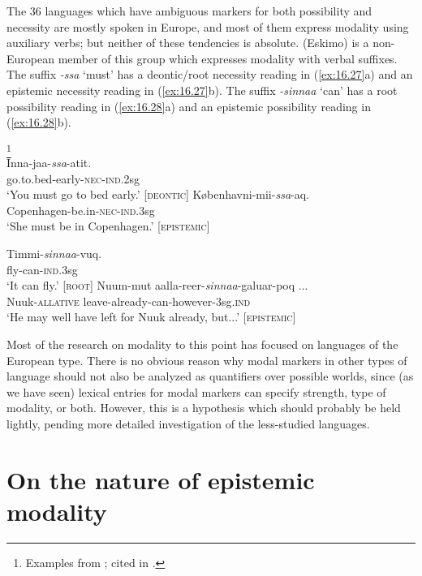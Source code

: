 The 36 languages which have ambiguous markers for both possibility and necessity are mostly spoken in Europe, and most of them express modality using auxiliary verbs; but neither of these tendencies is absolute.  (Eskimo) is a non-European member of this group which expresses modality with verbal suffixes. The suffix \textit{-ssa} ‘must’ has a deontic/root necessity reading in (\ref{ex:16.27}a) and an epistemic necessity reading in (\ref{ex:16.27}b). The suffix \textit{-sinnaa} ‘can’ has a root possibility reading in (\ref{ex:16.28}a) and an epistemic possibility reading in (\ref{ex:16.28}b).


\ea \label{ex:16.27}
\footnote{Examples from \citet[292–294, p.c.]{Fortescue1984}; cited in \citet{vanderAuweraAmmann2013}.} \\ 
\ea  \gll Inna-jaa-\textit{ssa}-atit.\\
go.to.bed-early-\textsc{nec-ind}.2sg\\
\glt ‘You must go to bed early.’ \hfill  [\textsc{deontic}]
\ex \gll Københavni-mii-\textit{ssa}-aq.\\
Copenhagen-be.in-\textsc{nec-ind}.3sg\\
\glt ‘She must be in Copenhagen.’ \hfill  [\textsc{epistemic}]
\z \z

\ea \label{ex:16.28} \gll Timmi-\textit{sinnaa}-vuq.\\
fly-can-\textsc{ind}.3sg\\
\glt ‘It can fly.’ \hfill  [\textsc{root}]
\ex \gll  Nuum-mut  aalla-reer-\textit{sinnaa}-galuar-poq ...\\
Nuuk-\textsc{allative}  leave-already-can-however-3sg.\textsc{ind}\\
\glt ‘He may well have left for Nuuk already, but...’ \hfill  [\textsc{epistemic}]
\z


Most of the research on modality to this point has focused on languages of the European type. There is no obvious reason why modal markers in other types of language should not also be analyzed as quantifiers over possible worlds, since (as we have seen) lexical entries for modal markers can specify strength, type of modality, or both. However, this is a hypothesis which should probably be held lightly, pending more detailed investigation of the less-studied languages.


\section{On the nature of epistemic modality}\label{sec:16.5}

